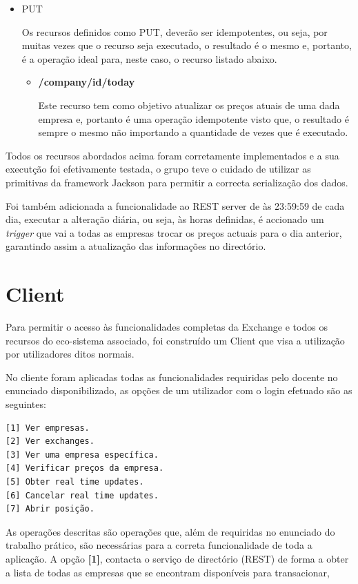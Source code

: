 \documentclass[a4paper,12pt]{article}
\begin{document}
\begin{itemize}
\begin{itemize}
    
  \end{itemize}
\item PUT
  \par Os recursos definidos como PUT, deverão ser idempotentes, ou seja, por muitas vezes que o recurso seja executado, o resultado é o mesmo e, portanto, é a operação ideal para, neste caso, o recurso listado abaixo.
  \begin{itemize}
    \item \textbf{/company/{id}/today}

    \par Este recurso tem como objetivo atualizar os preços atuais de uma dada empresa e, portanto é uma operação idempotente visto que, o resultado é sempre o mesmo não importando a quantidade de vezes que é executado.
  \end{itemize}
\end{itemize}

\par Todos os recursos abordados acima foram corretamente implementados e a sua executção foi efetivamente testada, o grupo teve o cuidado de utilizar as primitivas da framework Jackson para permitir a correcta serialização dos dados.
\par Foi também adicionada a funcionalidade ao REST server de às 23:59:59 de cada dia, executar a alteração diária, ou seja, às horas definidas, é accionado um \textit{trigger} que vai a todas as empresas trocar os preços actuais para o dia anterior, garantindo assim a atualização das informações no directório.

\section{Client}
Para permitir o acesso às funcionalidades completas da Exchange e todos os recursos do eco-sistema associado, foi construído um Client que visa a utilização por utilizadores ditos normais.
\par No cliente foram aplicadas todas as funcionalidades requiridas pelo docente no enunciado disponibilizado, as opções de um utilizador com o login efetuado são as seguintes:
\begin{verbatim}
[1] Ver empresas.
[2] Ver exchanges.
[3] Ver uma empresa específica.
[4] Verificar preços da empresa.
[5] Obter real time updates.
[6] Cancelar real time updates.
[7] Abrir posição.
\end{verbatim}
\par As operações descritas são operações que, além de requiridas no enunciado do trabalho prático, são necessárias para a correta funcionalidade de toda a aplicação. A opção \textbf{[1]}, contacta o serviço de directório (REST) de forma a obter a lista de todas as empresas que se encontram disponíveis para transacionar, 
\end{document}
